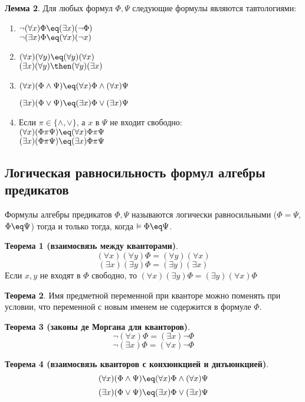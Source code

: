 \textbf{Лемма 2}. Для любых формул $\Phi, \Psi$ следующие формулы являются тавтологиями:
\begin{enumerate}
    \item $\lnot(\forall x)\Phi \eq (\exists x)(\lnot \Phi)$ \\
    $\lnot(\exists x)\Phi \eq (\forall x)(\lnot x)$

    \item $(\forall x)(\forall y) \eq (\forall y)(\forall x)$ \\
    $(\exists x)(\forall y) \then (\forall y)(\exists x)$

    \item $(\forall x)(\Phi \land \Psi) \eq (\forall x)\Phi \land (\forall x)\Psi$

    $(\exists x)(\Phi \lor \Psi) \eq (\exists x)\Phi \lor (\exists x)\Psi$ \\

    \item Если $\pi \in \{\land, \lor\}$, а $x$ в $\Psi$ не входит свободно: \\
    $(\forall x)(\Phi \pi \Psi) \eq (\forall x)\Phi \pi \Psi$ \\
    $(\exists x)(\Phi \pi \Psi) \eq (\exists x)\Phi \pi \Psi$
\end{enumerate}
\subsection{Логическая равносильность формул алгебры предикатов}
\dftion Формулы алгебры предикатов $\Phi, \Psi$ называются логически равносильными ($\Phi = \Psi$, $\Phi \eq \Psi$) тогда и только тогда, когда $\vDash \Phi \eq \Psi$.

\textbf{Теорема 1 (взаимосвязь между кванторами)}.
$$(\forall x)(\forall y)\Phi = (\forall y)(\forall x)$$
$$(\exists x)(\exists y)\Phi = (\exists y)(\exists x)$$
Если $x, y$ не входят в $\Phi$ свободно, то $(\forall x)(\exists y)\Phi = (\exists y)(\forall x)\Phi$

\textbf{Теорема 2}. Имя предметной переменной при кванторе можно поменять при условии, что переменной с новым именем не содержится в формуле $\Phi$.

\textbf{Теорема 3 (законы де Моргана для кванторов)}.
$$\lnot (\forall x) \Phi = (\exists x)\lnot \Phi$$
$$\lnot (\exists x) \Phi = (\forall x)\lnot \Phi$$

\textbf{Теорема 4 (взаимосвязь кванторов с конхюнкцией и дизъюнкцией)}.
$$(\forall x)(\Phi \land \Psi) \eq (\forall x)\Phi \land (\forall x)\Psi$$
$$(\exists x)(\Phi \lor \Psi) \eq (\exists x)\Phi \lor (\exists x)\Psi$$

